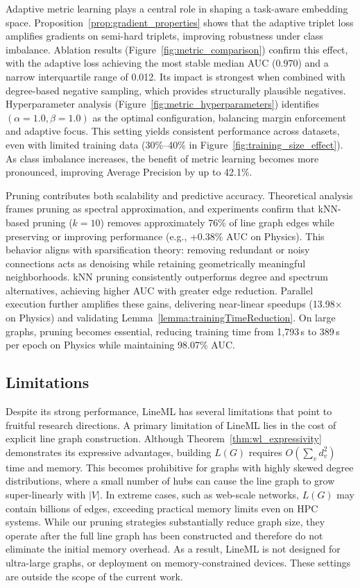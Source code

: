 \documentclass[pdflatex,sn-mathphys-num]{sn-jnl}%
\theoremstyle{thmstyleone}%
\theoremstyle{thmstyletwo}%
\theoremstyle{thmstylethree}%
\theoremstyle{plain} %
\theoremstyle{definition} %
\theoremstyle{remark} %
\theoremstyle{plain} %
\begin{document}
Adaptive metric learning plays a central role in shaping a task-aware embedding space. 
Proposition~\ref{prop:gradient_properties} shows that the adaptive triplet loss amplifies gradients on semi-hard triplets, improving robustness under class imbalance. 
Ablation results (Figure~\ref{fig:metric_comparison}) confirm this effect, with the adaptive loss achieving the most stable median AUC (0.970) and a narrow interquartile range of 0.012. 
Its impact is strongest when combined with degree-based negative sampling, which provides structurally plausible negatives. 
Hyperparameter analysis (Figure~\ref{fig:metric_hyperparameters}) identifies $(\alpha=1.0,\beta=1.0)$ as the optimal configuration, balancing margin enforcement and adaptive focus. 
This setting yields consistent performance across datasets, even with limited training data (30\%--40\% in Figure~\ref{fig:training_size_effect}). 
As class imbalance increases, the benefit of metric learning becomes more pronounced, improving Average Precision by up to 42.1\%.

Pruning contributes both scalability and predictive accuracy. 
Theoretical analysis frames pruning as spectral approximation, and experiments confirm that kNN-based pruning ($k=10$) removes approximately 76\% of line graph edges while preserving or improving performance (e.g., +0.38\% AUC on Physics). 
This behavior aligns with sparsification theory: removing redundant or noisy connections acts as denoising while retaining geometrically meaningful neighborhoods. 
kNN pruning consistently outperforms degree and spectrum alternatives, achieving higher AUC with greater edge reduction. 
Parallel execution further amplifies these gains, delivering near-linear speedups (13.98$\times$ on Physics) and validating Lemma~\ref{lemma:trainingTimeReduction}. 
On large graphs, pruning becomes essential, reducing training time from 1,793\,s to 389\,s per epoch on Physics while maintaining 98.07\% AUC.




\subsection{Limitations}
\label{sec:limitations}


Despite its strong performance, LineML has several limitations that point to fruitful research directions. 
A primary limitation of LineML lies in the cost of explicit line graph construction. 
Although Theorem~\ref{thm:wl_expressivity} demonstrates its expressive advantages, building $L(G)$ requires $O(\sum_v d_v^2)$ time and memory. 
This becomes prohibitive for graphs with highly skewed degree distributions, where a small number of hubs can cause the line graph to grow super-linearly with $|V|$. In extreme cases, such as web-scale networks, $L(G)$ may contain billions of edges, exceeding practical memory limits even on HPC systems.
While our pruning strategies substantially reduce graph size, they operate after the full line graph has been constructed and therefore do not eliminate the initial memory overhead. As a result, LineML is not designed for ultra-large graphs, or deployment on memory-constrained devices. These settings are outside the scope of the current work.
\end{document}
